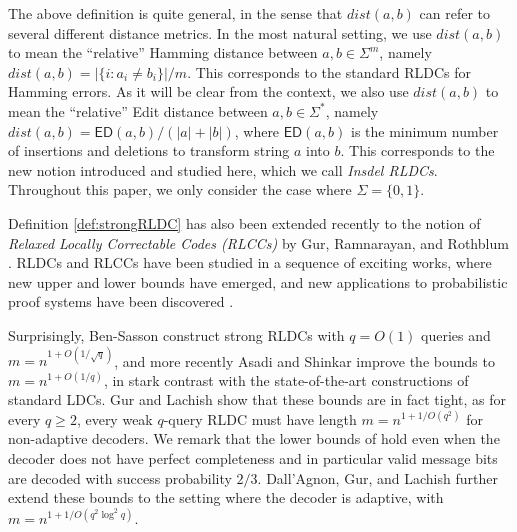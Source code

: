 \documentclass[10pt,a4paper]{article}
\theoremstyle{remark}
\newcommand{\etal}{\text{et al.}\xspace}
\newcommand{\ED}{\ensuremath{\mathsf{ED}}\xspace}%
\newcommand{\authnote}[3]{\textcolor{#2}{{\sf (#1's Note: {\sl{#3}})}}}
\newcommand{\xnote}{\authnote{Xin}{magenta}}
\newcommand{\enote}{\authnote{Elena}{green}}
\newcommand{\knote}{\authnote{Kuan}{cyan}}
\newcommand{\authnote}{}
\newcommand{\xnote}[1]{}
\newcommand{\enote}[1]{}
\newcommand{\knote}[1]{}
\begin{document}



The above definition is quite general, in the sense that $dist(a,b)$ can refer to several different distance metrics. In the most natural setting, we use $dist(a,b)$ to mean the ``relative'' Hamming distance between $a,b\in \Sigma^m$, namely $dist(a,b)=|\{i\colon a_i\ne b_i\}|/m$. This corresponds to the standard RLDCs for Hamming errors. As it will be clear from the context, we also use $dist(a,b)$ to mean the ``relative'' Edit distance between $a,b \in \Sigma^*$,  namely $dist(a, b)=\ED(a, b)/(|a|+|b|)$, where $\ED(a, b)$ is the minimum number of insertions and deletions to transform string $a$ into $b$. This corresponds to the new notion introduced and studied here, which we call {\em  Insdel RLDCs}. Throughout this paper, we only consider the case where $\Sigma=\{0,1\}$.



Definition \ref{def:strongRLDC} has also been extended recently to the notion of {\em Relaxed Locally Correctable Codes (RLCCs)} by Gur, Ramnarayan, and Rothblum \cite{GurRR20}. RLDCs and RLCCs have been studied  in a sequence of exciting works, where new upper and lower bounds have emerged, and new applications to probabilistic proof systems have been discovered \cite{gur2019lower, ChiesaGS20, GurRR20, AsadiS21, GurL21}.

Surprisingly, Ben-Sasson \etal \cite{Ben-SassonGHSV06} construct strong RLDCs with $q=O(1)$ queries and  $m=n^{1+O(1/\sqrt{q})}$, and more recently Asadi and Shinkar \cite{AsadiS21} improve the bounds to $m=n^{1+O(1/q)}$, in stark contrast with the state-of-the-art constructions of standard LDCs. 
Gur and Lachish \cite{GurL21} show that these bounds are in fact tight, as for every $q\geq 2$, every weak $q$-query RLDC must have length  $m=n^{1+1/O(q^{2})}$ for non-adaptive decoders. 
 We remark that the lower bounds of \cite{GurL21} hold even when the decoder does not have perfect completeness and in particular valid message bits are decoded with success probability $2/3.$ 
 Dall'Agnon, Gur, and Lachish \cite{dall2021structural} further extend these bounds to the setting where the decoder is adaptive, with $m=n^{1+1/O(q^{2}\log^2 q)}.$ 
 
\end{document}
